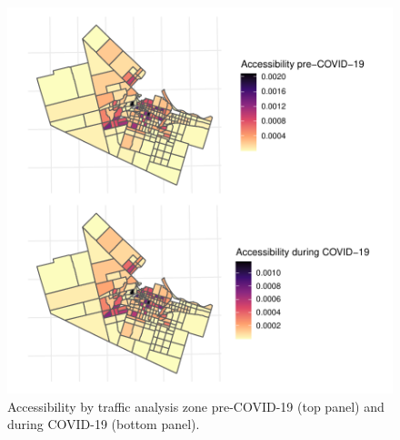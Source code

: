 \documentclass[]{elsarticle} %
\begin{document}
\begin{figure}

{\centering \includegraphics[width=1\linewidth]{Accessibility-Foodbanks-Hamilton_files/figure-latex/plot-accessibility-1} 

}

\caption{\label{fig:accessibility}Accessibility by traffic analysis zone pre-COVID-19 (top panel) and during COVID-19 (bottom panel).}\label{fig:plot-accessibility}
\end{figure}
\end{document}
